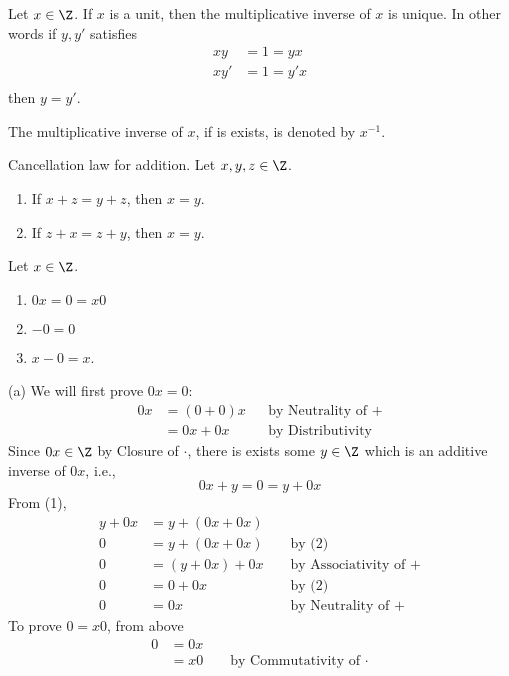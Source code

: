 \begin{prop}
  Let $x \in \Z$.
  If $x$ is a unit, then the multiplicative inverse of $x$ is unique.
  In other words if $y,y'$ satisfies
  \begin{align*}
    x  y &= 1 = y x \\
    x  y' &= 1 = y' x \\
  \end{align*}
  then $y = y'$.
\end{prop}

\begin{defn}
  The multiplicative inverse of $x$, if is exists, is denoted by $x^{-1}$.
\end{defn}

\begin{prop}
  Cancellation law for addition.
  Let $x, y, z \in \Z$.
  \begin{enumerate}[nosep,label=\textnormal{(\alph*)}]
    \item If $x + z = y + z$, then $x = y$.
    \item If $z + x = z + y$, then $x = y$.
  \end{enumerate}
\end{prop}

\begin{prop}
  Let $x \in \Z$.
  \begin{enumerate}[nosep,label=\textnormal{(\alph*)}]
  \item $0x = 0 = x0$
  \item $-0 = 0$
  \item $x - 0 = x$. 
  \end{enumerate}
\end{prop}
\proof
(a) We will first prove $0x = 0$:
\begin{align*}
  0x &= (0 + 0)x & & \text{by Neutrality of $+$} \\
     &= 0x + 0x  & & \text{by Distributivity} \tag{1}
\end{align*}
Since $0x \in \Z$ by Closure of $\cdot$, there is
exists some $y \in \Z$ which is an additive inverse of $0x$, i.e.,
\[
0x + y = 0 = y + 0x \tag{2}
\]
From (1),
\begin{align*}
  y + 0x &= y + (0x + 0x)  \\
  0      &= y + (0x + 0x) & & \text{ by (2)} \\
  0      &= (y + 0x) + 0x & & \text{ by Associativity of $+$} \\
  0      &= 0 + 0x        & & \text{ by (2)} \\
  0      &= 0x            & & \text{ by Neutrality of $+$}
\end{align*}
To prove $0 = x0$, from above
\begin{align*}
  0 &= 0x \\
    &= x0 & & \text{ by Commutativity of $\cdot$}
\end{align*}

